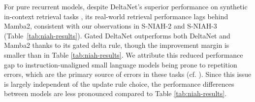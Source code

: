 \documentclass{article}
\begin{document}
For pure recurrent models, despite DeltaNet's superior performance on synthetic in-context retrieval tasks \citep{yang2024parallelizing}, its real-world retrieval performance lags behind Mamba2, consistent with our observations in S-NIAH-2 and S-NIAH-3 (Table~\ref{tab:niah-results}). Gated DeltaNet outperforms both DeltaNet and Mamba2 thanks to its gated delta rule, though the improvement margin is smaller than in Table \ref{tab:niah-results}. We attribute this reduced performance gap to instruction-unaligned small language models being prone to repetition errors, which are the primary source of errors in these tasks (cf. \citet[][Appendix E]{arora-2024-jrt}). Since this issue is largely independent of the update rule choice, the performance differences between models are less pronounced compared to Table \ref{tab:niah-results}. 
\begin{figure}[htbp]
\centering
{}
\end{figure}
\end{document}
